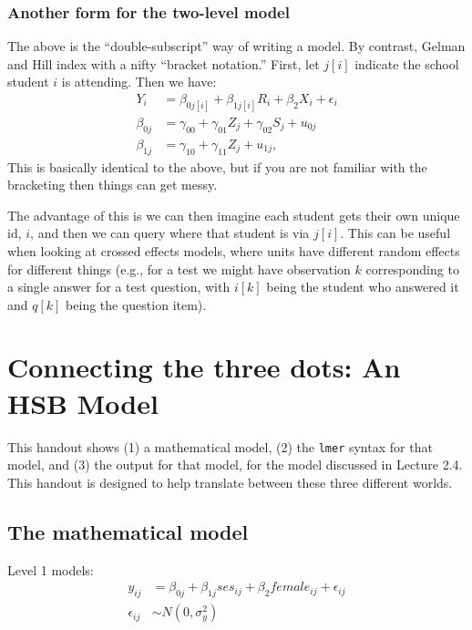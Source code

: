 \documentclass[
  letterpaper,
  DIV=11,
  numbers=noendperiod]{scrreprt}
\begin{document}
\subsection{Another form for the two-level
model}\label{another-form-for-the-two-level-model}

The above is the ``double-subscript'' way of writing a model. By
contrast, Gelman and Hill index with a nifty ``bracket notation.''
First, let \(j[i]\) indicate the school student \(i\) is attending. Then
we have: \[\begin{aligned}
Y_{i} &= \beta_{0j[i]} + \beta_{1j[i]} R_{i} + \beta_{2} X_{i} + \epsilon_{i} \\
\beta_{0j} &= \gamma_{00} + \gamma_{01} Z_{j} + \gamma_{02} S_{j} + u_{0j} \\
\beta_{1j} &= \gamma_{10} + \gamma_{11} Z_{j} + u_{1j},
\end{aligned}\] This is basically identical to the above, but if you are
not familiar with the bracketing then things can get messy.

The advantage of this is we can then imagine each student gets their own
unique id, \(i\), and then we can query where that student is via
\(j[i]\). This can be useful when looking at crossed effects models,
where units have different random effects for different things (e.g.,
for a test we might have observation \(k\) corresponding to a single
answer for a test question, with \(i[k]\) being the student who answered
it and \(q[k]\) being the question item).

\chapter{Connecting the three dots: An HSB
Model}\label{connecting-the-three-dots-an-hsb-model}

This handout shows (1) a mathematical model, (2) the \texttt{lmer}
syntax for that model, and (3) the output for that model, for the model
discussed in Lecture 2.4. This handout is designed to help translate
between these three different worlds.

\section{The mathematical model}\label{the-mathematical-model}

Level 1 models: \[
\begin{aligned}
y_{ij} &= \beta_{0j} + \beta_{1j} ses_{ij} + \beta_2 female_{ij} +  \epsilon_{ij} \\
\epsilon_{ij} &\sim N( 0, \sigma^2_y ) \\
\end{aligned}
\]
\end{document}
